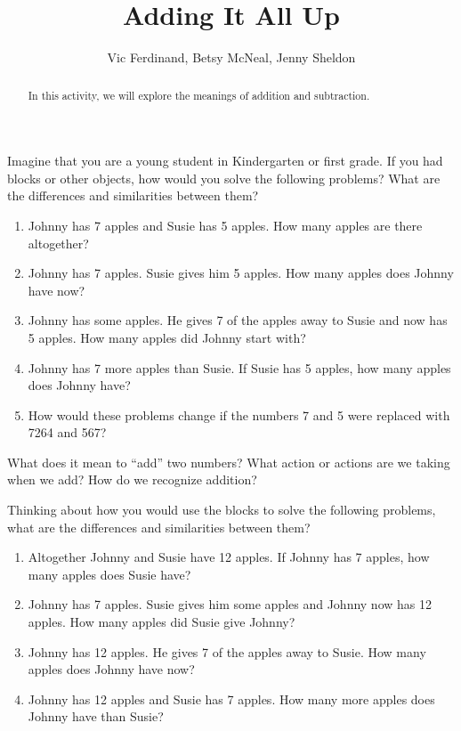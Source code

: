 \documentclass{ximera}
\title{Adding It All Up}
\author{Vic Ferdinand, Betsy McNeal, Jenny Sheldon}
\begin{document}
\begin{abstract} In this activity, we will explore the meanings of addition and subtraction. \end{abstract}
\maketitle



\begin{problem}
Imagine that you are a young student in Kindergarten or first grade.  If you had blocks or other objects, how would you solve the following problems?  What are the differences and similarities between them?
\begin{enumerate}
\item Johnny has 7 apples and Susie has 5 apples.  How many apples are there altogether?
\item Johnny has 7 apples.  Susie gives him 5 apples.  How many apples does Johnny have now?
\item Johnny has some apples.  He gives 7 of the apples away to Susie and now has 5 apples.  How many apples did Johnny start with?
\item Johnny has 7 more apples than Susie.  If Susie has 5 apples, how many apples does Johnny have?
\item How would these problems change if the numbers 7 and 5 were replaced with 7264 and 567?
\end{enumerate}
\end{problem}

\begin{problem}
What does it mean to ``add'' two numbers? What action or actions are we taking when we add? How do we recognize addition?
\end{problem}

\begin{problem}
 Thinking about how you would use the blocks to solve the following problems, what are the differences and similarities between them?
\begin{enumerate}
\item Altogether Johnny and Susie have 12 apples.  If Johnny has 7 apples, how many apples does Susie have?
\item Johnny has 7 apples.  Susie gives him some apples and Johnny now has 12 apples.  How many apples did Susie give Johnny?
\item Johnny has 12 apples.  He gives 7 of the apples away to Susie.  How many apples does Johnny have now?
\item Johnny has 12 apples and Susie has 7 apples.  How many more apples does Johnny have than Susie?
\end{enumerate}
\end{problem}
\end{document}

